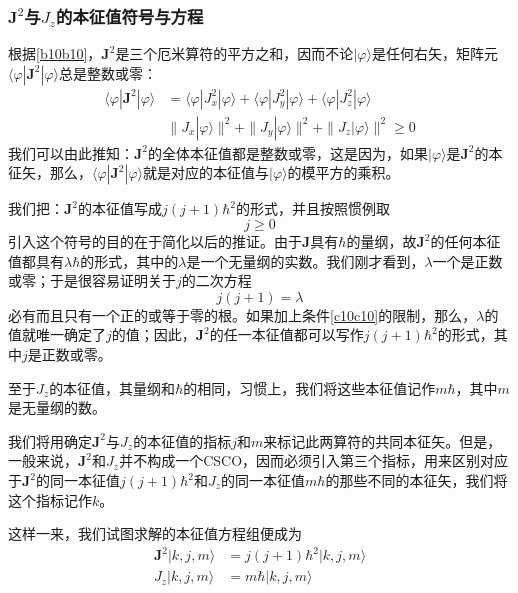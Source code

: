 \documentclass[]{article}
\begin{document}
\subsubsection{$\boldsymbol{J}^2$与$J_z$的本征值符号与方程}
根据\eqref{b10b10}，$\boldsymbol{J}^2$是三个厄米算符的平方之和，因而不论$|\varphi\rangle$是任何右矢，矩阵元$\langle\varphi|\boldsymbol{J}^2|\varphi\rangle$总是整数或零：
\begin{align}
	\langle\varphi|\boldsymbol{J}^2|\varphi\rangle&=\langle\varphi|J_x^2|\varphi\rangle+\langle\varphi|J_y^2|\varphi\rangle+\langle\varphi|J_z^2|\varphi\rangle\nonumber\\
	&\parallel J_x|\varphi\rangle\parallel^2+\parallel J_y|\varphi\rangle\parallel^2+\parallel J_z|\varphi\rangle\parallel^2\geqslant0
\end{align}
我们可以由此推知：$\boldsymbol{J}^2$的全体本征值都是整数或零，这是因为，如果$|\varphi\rangle$是$\boldsymbol{J}^2$的本征矢，那么，$\langle\varphi|\boldsymbol{J}^2|\varphi\rangle$就是对应的本征值与$|\varphi\rangle$的模平方的乘积。\par 
我们把：$\boldsymbol{J}^2$的本征值写成$j(j+1)\hbar^2$的形式，并且按照惯例取
\begin{equation}
	j\geqslant0
	\label{c10c10}
\end{equation}
引入这个符号的目的在于简化以后的推证。由于$\boldsymbol{J}$具有$\hbar$的量纲，故$\boldsymbol{J}^2$的任何本征值都具有$\lambda\hbar$的形式，其中的$\lambda$是一个无量纲的实数。我们刚才看到，$\lambda$一个是正数或零；于是很容易证明关于$j$的二次方程
\begin{equation}
	j(j+1)=\lambda
\end{equation}
必有而且只有一个正的或等于零的根。如果加上条件\eqref{c10c10}的限制，那么，$\lambda$的值就唯一确定了$j$的值；因此，$\boldsymbol{J}^2$的任一本征值都可以写作$j(j+1)\hbar^2$的形式，其中$j$是正数或零。\par 
至于$J_z$的本征值，其量纲和$\hbar$的相同，习惯上，我们将这些本征值记作$m\hbar$，其中$m$是无量纲的数。\par 
我们将用确定$\boldsymbol{J}^2$与$J_z$的本征值的指标$j$和$m$来标记此两算符的共同本征矢。但是，一般来说，$\boldsymbol{J}^2$和$J_z$并不构成一个CSCO，因而必须引入第三个指标，用来区别对应于$\boldsymbol{J}^2$的同一本征值$j(j+1)\hbar^2$和$J_z$的同一本征值$m\hbar$的那些不同的本征矢，我们将这个指标记作$k$。\par 
这样一来，我们试图求解的本征值方程组便成为
\begin{align}
	\boldsymbol{J}^2|k,j,m\rangle&=j(j+1)\hbar^2|k,j,m\rangle\nonumber\\
	J_z|k,j,m\rangle&=m\hbar|k,j,m\rangle
	\label{c12c12}
\end{align}
\end{document}
